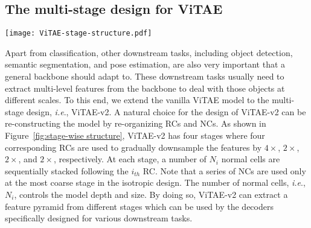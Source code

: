 \documentclass[twocolumn]{svjour3}          \smartqed  \usepackage{natbib}
\newcommand{\ie}{i.e}
\def\onedot{.\xspace}
\def\ie{\emph{i.e}\onedot}
\begin{document}
\subsection{The multi-stage design for ViTAE}

\begin{figure*}[ht]
    \centering
    \texttt{[image: ViTAE-stage-structure.pdf]}
    \caption{The structure of the proposed ViTAEv2 in the multi-stage manner. The RCs and NCs are re-arranged in a stage-wise manner. At each stage, a number of NCs are sequentially stacked following each RC, which gradually downsamples the features by a certain ratio, \ie, 4$\times$, 2$\times$, 2$\times$, and 2$\times$, respectively.}
    \label{fig:stage-wise structure}
\end{figure*}

Apart from classification, other downstream tasks, including object detection, semantic segmentation, and pose estimation, are also very important that a general backbone should adapt to. These downstream tasks usually need to extract multi-level features from the backbone to deal with those objects at different scales. To this end, we extend the vanilla ViTAE model to the multi-stage design, \ie, ViTAE-v2. A natural choice for the design of ViTAE-v2 can be re-constructing the model by re-organizing RCs and NCs. As shown in Figure~\ref{fig:stage-wise structure}, ViTAE-v2 has four stages where four corresponding RCs are used to gradually downsample the features by $4\times$, $2\times$, $2\times$, and $2\times$, respectively. At each stage, a number of $N_i$ normal cells are sequentially stacked following the $i_{th}$ RC. Note that a series of NCs are used only at the most coarse stage in the isotropic design. The number of normal cells, \ie, $N_i$, controls the model depth and size. By doing so, ViTAE-v2 can extract a feature pyramid from different stages which can be used by the decoders specifically designed for various downstream tasks.
\end{document}
